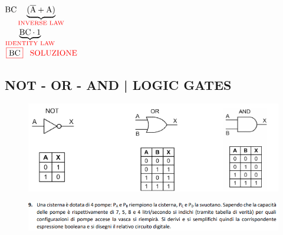 $ \text{B}\text{C}\underbrace{(\overline{\text{A}} + \text{A})} _{\textrm{\color{red} INVERSE LAW}} $ \\

$ \underbrace{\text{B}\text{C} \cdot 1} _{\textrm{\color{red} IDENTITY LAW}} $ \\

$ \color{red}\boxed{\normalcolor\B\C} \hspace{0.3cm}\textrm{\color{red} SOLUZIONE}$ \\


\subsection{NOT - OR - AND | LOGIC GATES}

\begin{figure}[ht]
	\includegraphics[width=.8\linewidth]{not_or_and_logic_gates}
	\label{fig:not_or_and_logic_gates}
\end{figure}


\newpage

\begin{figure}[ht]
	\includegraphics[width=1\linewidth]{es9_esBoole}
	\label{fig:es9esBoole}
\end{figure}



